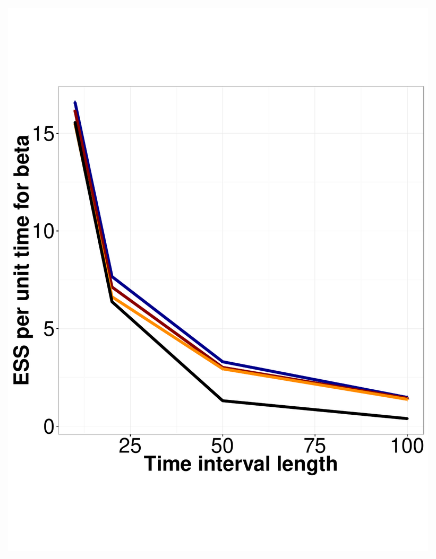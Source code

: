 \begin{figure}
\begin{minipage}[hp]{0.24\linewidth}
    \includegraphics [width=0.99\textwidth, angle=0]{figs/ESS_vs_t_beta_fixobservation.pdf}
  \end{minipage}
  \begin{minipage}[hp]{0.24\linewidth}
  \centering

\end{minipage}
\end{figure}
